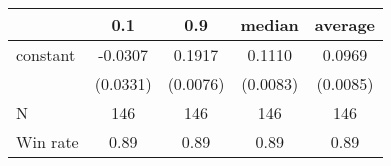 \begin{tabular}{lcccc}
\hline
         &   0.1    &   0.9    &  median  & average   \\
\midrule
\midrule
constant & -0.0307  & 0.1917   & 0.1110   & 0.0969    \\
         & (0.0331) & (0.0076) & (0.0083) & (0.0085)  \\
N        & 146      & 146      & 146      & 146       \\
Win rate & 0.89     & 0.89     & 0.89     & 0.89      \\
\hline
\end{tabular}